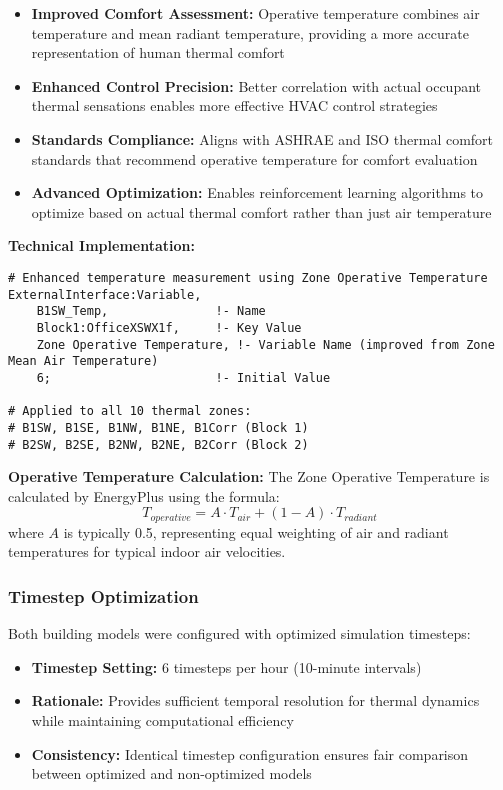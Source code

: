\documentclass[12pt,a4paper]{article}
\begin{document}
\begin{itemize}
    \item \textbf{Improved Comfort Assessment:} Operative temperature combines air temperature and mean radiant temperature, providing a more accurate representation of human thermal comfort
    \item \textbf{Enhanced Control Precision:} Better correlation with actual occupant thermal sensations enables more effective HVAC control strategies
    \item \textbf{Standards Compliance:} Aligns with ASHRAE and ISO thermal comfort standards that recommend operative temperature for comfort evaluation
    \item \textbf{Advanced Optimization:} Enables reinforcement learning algorithms to optimize based on actual thermal comfort rather than just air temperature
\end{itemize}

\textbf{Technical Implementation:}
\begin{lstlisting}[style=python, caption=Temperature Variable Configuration]
# Enhanced temperature measurement using Zone Operative Temperature
ExternalInterface:Variable,
    B1SW_Temp,               !- Name
    Block1:OfficeXSWX1f,     !- Key Value  
    Zone Operative Temperature, !- Variable Name (improved from Zone Mean Air Temperature)
    6;                       !- Initial Value

# Applied to all 10 thermal zones:
# B1SW, B1SE, B1NW, B1NE, B1Corr (Block 1)
# B2SW, B2SE, B2NW, B2NE, B2Corr (Block 2)
\end{lstlisting}

\textbf{Operative Temperature Calculation:}
The Zone Operative Temperature is calculated by EnergyPlus using the formula:
\begin{equation}
T_{operative} = A \cdot T_{air} + (1-A) \cdot T_{radiant}
\end{equation}
where $A$ is typically 0.5, representing equal weighting of air and radiant temperatures for typical indoor air velocities.

\subsubsection{Timestep Optimization}

Both building models were configured with optimized simulation timesteps:
\begin{itemize}
    \item \textbf{Timestep Setting:} 6 timesteps per hour (10-minute intervals)
    \item \textbf{Rationale:} Provides sufficient temporal resolution for thermal dynamics while maintaining computational efficiency
    \item \textbf{Consistency:} Identical timestep configuration ensures fair comparison between optimized and non-optimized models
\end{itemize}
\end{document}

